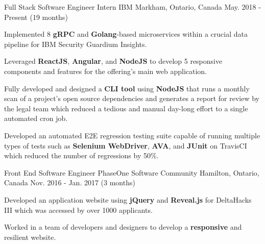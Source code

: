 


\begin{cventries}


\cventry
{Full Stack Software Engineer Intern} %
{IBM} %
{Markham, Ontario, Canada} %
{May. 2018 - Present (19 months)} %
{ %
\begin{cvitems}
\item {Implemented 8 \textbf{gRPC} and \textbf{Golang}-based microservices within a crucial data pipeline for IBM Security Guardium Insights.}
\item {Leveraged \textbf{ReactJS}, \textbf{Angular}, and \textbf{NodeJS} to develop 5 responsive components and features for the offering's main web application.}
\item {Fully developed and designed a \textbf{CLI tool} using \textbf{NodeJS} that runs a monthly scan of a project's open source dependencies and generates a report for review by the legal team which reduced a tedious and manual day-long effort to a single automated cron job.}
\item {Developed an automated E2E regression testing suite capable of running multiple types of tests such as \textbf{Selenium WebDriver}, \textbf{AVA}, and \textbf{JUnit} on TravisCI which reduced the number of regressions by 50\%.}
\end{cvitems}
}


\cventry
{Front End Software Engineer} %
{PhaseOne Software Community} %
{Hamilton, Ontario, Canada} %
{Nov. 2016 - Jan. 2017 (3 months)} %
{ %
\begin{cvitems}
\item {Developed an application website using \textbf{jQuery} and \textbf{Reveal.js} for DeltaHacks III which was accessed by over 1000 applicants.}
\item {Worked in a team of developers and designers to develop a \textbf{responsive} and resilient website.}
\end{cvitems}
}


\end{cventries}